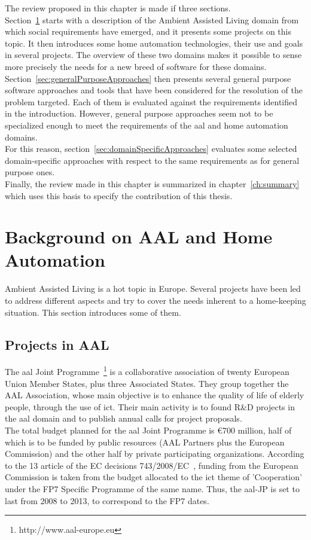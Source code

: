 The review proposed in this chapter is made if three sections.\\
Section~\ref{sec:background} starts with a description of the Ambient Assisted Living domain from which social requirements have emerged, and it presents some projects on this topic. It then introduces some home automation technologies, their use and goals in several projects. The overview of these two domains makes it possible to sense more precisely the needs for a new breed of software for these domains.\\
Section~\ref{sec:generalPurposeApproaches} then presents several general purpose software approaches and tools that have been considered for the resolution of the problem targeted. Each of them is evaluated against the requirements identified in the introduction. However, general purpose approaches seem not to be specialized enough to meet the requirements of the \gls{aal} and home automation domains.\\
For this reason, section~\ref{sec:domainSpecificApproaches} evaluates some selected domain-specific approaches with respect to the same requirements as for general purpose ones.\\
Finally, the review made in this chapter is summarized in chapter~\ref{ch:summary} which uses this basis to specify the contribution of this thesis.


\section{Background on AAL and Home Automation}
\label{sec:background}

Ambient Assisted Living is a hot topic in Europe. Several projects have been led to address different aspects and try to cover the needs inherent to a home-keeping situation. This section introduces some of them.

\subsection{Projects in AAL}

The \gls{aal} Joint Programme~\footnote{http://www.aal-europe.eu} is a collaborative association of twenty European Union Member States, plus three Associated States. They group together the AAL Association, whose main objective is to enhance the quality of life of elderly people, through the use of \gls{ict}. Their main activity is to found R\&D projects in the \gls{aal} domain and to publish annual calls for project proposals.\\
The total budget planned for the \gls{aal} Joint Programme is €700 million, half of which is to be funded by public resources (AAL Partners plus the European Commission) and the other half by private participating organizations. According to the 13 article of the EC decisions 743/2008/EC~\cite{743/2008/EC}, funding from the European Commission is taken from the budget allocated to the \gls{ict} theme of 'Cooperation' under the FP7 Specific Programme of the same name. Thus, the \gls{aal}-JP is set to last from 2008 to 2013, to correspond to the FP7 dates.\\


